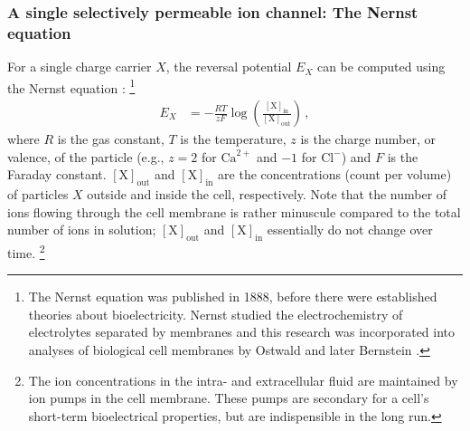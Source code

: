 \subsubsection{A single selectively permeable ion channel: The Nernst equation}
For a single charge carrier $X$, the reversal potential $E_X$ can be computed using the Nernst equation \citep{nernst1888kinetik}:%
\footnote{The Nernst equation was published in 1888, before there were established theories about bioelectricity. Nernst studied the electrochemistry of electrolytes separated by membranes and this research was incorporated into analyses of biological cell membranes by Ostwald and later Bernstein \citep[see][Chapter~5]{bernstein1912elektrobiologie}.}
\newcommand{\Cout}[1]{\ensuremath{[\mathrm{#1}]_\mathrm{out}}}
\newcommand{\Cin}[1]{\ensuremath{[\mathrm{#1}]_\mathrm{in}}}
\begin{align}
	E_X &= -\frac{RT}{zF} \log \left( \frac{\Cin{X}}{\Cout{X}} \right) \,,
	\label{eqn:nernst}
\end{align}
where $R$ is the gas constant, $T$ is the temperature, $z$ is the charge number, or valence, of the particle (e.g., $z = 2$ for $\mathrm{Ca}^{2+}$ and $-1$ for $\mathrm{Cl}^-$) and $F$ is the Faraday constant. \Cout{X} and \Cin{X} are the concentrations (count per volume) of particles $X$ outside and inside the cell, respectively.
Note that the number of ions flowing through the cell membrane is rather minuscule compared to the total number of ions in solution; \Cout{X} and \Cin{X} essentially do not change over time.%
\footnote{The ion concentrations in the intra- and extracellular fluid are maintained by ion pumps in the cell membrane. These pumps are secondary for a cell's short-term bioelectrical properties, but are indispensible in the long run.}

